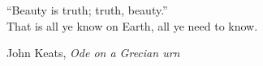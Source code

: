 \epigraph{``Beauty is truth; truth, beauty.'' \\
  That is all ye know on Earth,
  all ye need to know.}{John Keats, \emph{Ode on a Grecian urn}}
